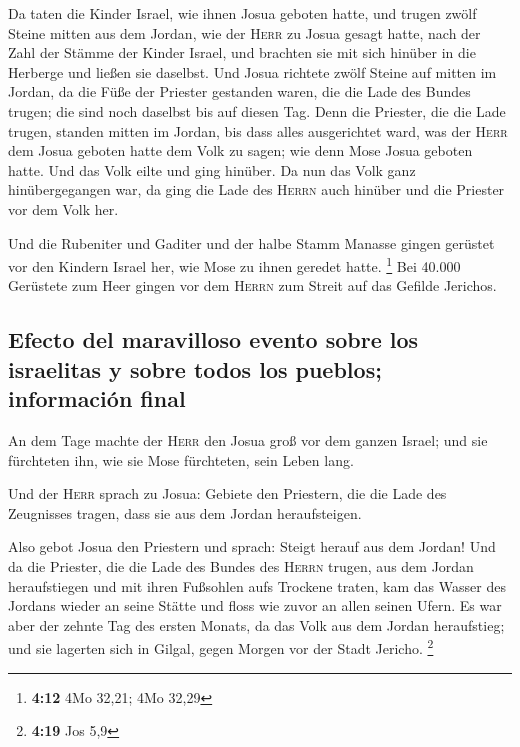  Da taten die Kinder Israel, wie ihnen Josua geboten
hatte, und trugen zwölf Steine mitten aus dem Jordan, wie der
\textsc{Herr} zu Josua gesagt hatte, nach der Zahl der Stämme der Kinder
Israel, und brachten sie mit sich hinüber in die Herberge und ließen sie
daselbst.  Und Josua richtete zwölf Steine auf mitten im
Jordan, da die Füße der Priester gestanden waren, die die Lade des
Bundes trugen; die sind noch daselbst bis auf diesen Tag.
 Denn die Priester, die die Lade trugen, standen mitten
im Jordan, bis dass alles ausgerichtet ward, was der \textsc{Herr} dem
Josua geboten hatte dem Volk zu sagen; wie denn Mose Josua geboten
hatte. Und das Volk eilte und ging hinüber.  Da nun das
Volk ganz hinübergegangen war, da ging die Lade des \textsc{Herrn} auch
hinüber und die Priester vor dem Volk her.

 Und die Rubeniter und Gaditer und der halbe Stamm
Manasse gingen gerüstet vor den Kindern Israel her, wie Mose zu ihnen
geredet hatte. \footnote{\textbf{4:12} 4Mo 32,21; 4Mo 32,29}
 Bei 40.000 Gerüstete zum Heer gingen vor dem
\textsc{Herrn} zum Streit auf das Gefilde Jerichos.

\hypertarget{efecto-del-maravilloso-evento-sobre-los-israelitas-y-sobre-todos-los-pueblos-informaciuxf3n-final}{%
\subsection{Efecto del maravilloso evento sobre los israelitas y sobre
todos los pueblos; información
final}\label{efecto-del-maravilloso-evento-sobre-los-israelitas-y-sobre-todos-los-pueblos-informaciuxf3n-final}}

 An dem Tage machte der \textsc{Herr} den Josua groß vor
dem ganzen Israel; und sie fürchteten ihn, wie sie Mose fürchteten, sein
Leben lang.

 Und der \textsc{Herr} sprach zu Josua: 
Gebiete den Priestern, die die Lade des Zeugnisses tragen, dass sie aus
dem Jordan heraufsteigen.

 Also gebot Josua den Priestern und sprach: Steigt herauf
aus dem Jordan!  Und da die Priester, die die Lade des
Bundes des \textsc{Herrn} trugen, aus dem Jordan heraufstiegen und mit
ihren Fußsohlen aufs Trockene traten, kam das Wasser des Jordans wieder
an seine Stätte und floss wie zuvor an allen seinen Ufern.
 Es war aber der zehnte Tag des ersten Monats, da das
Volk aus dem Jordan heraufstieg; und sie lagerten sich in Gilgal, gegen
Morgen vor der Stadt Jericho. \footnote{\textbf{4:19} Jos 5,9}


